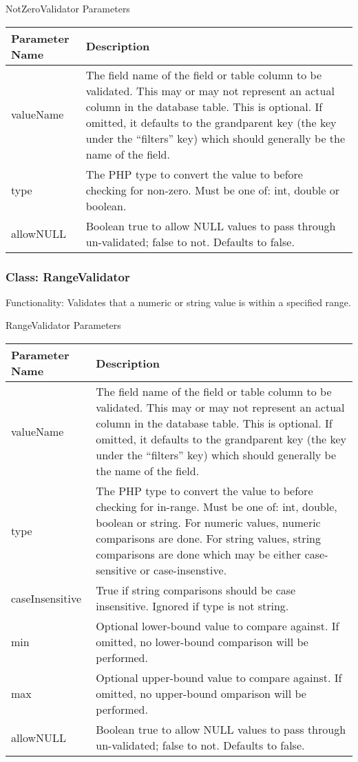 \documentclass[letterpaper,10pt,english]{sphinxmanual}
\begin{document}
NotZeroValidator Parameters

\begin{tabulary}{\linewidth}{|L|L|}
\hline
\textsf{\relax 
Parameter Name
} & \textsf{\relax 
Description
}\\
\hline
valueName
 & 
The field name of the field or table column to be validated.  This may or may not
represent an actual column in the database table.  This is optional.  If omitted, it
defaults to the grandparent key (the key under the ``filters'' key) which should
generally be the name of the field.
\\
\hline
type
 & 
The PHP type to convert the value to before checking for non-zero.  Must be one of:
int, double or boolean.
\\
\hline
allowNULL
 & 
Boolean true to allow NULL values to pass through un-validated; false to not.
Defaults to false.
\\
\hline\end{tabulary}



\subsubsection{Class: RangeValidator}
\label{jaxFrameworkGuide:class-rangevalidator}
Functionality: Validates that a numeric or string value is within a specified range.

RangeValidator Parameters

\begin{tabulary}{\linewidth}{|L|L|}
\hline
\textsf{\relax 
Parameter Name
} & \textsf{\relax 
Description
}\\
\hline
valueName
 & 
The field name of the field or table column to be validated.  This may or may not
represent an actual column in the database table.  This is optional.  If omitted, it
defaults to the grandparent key (the key under the ``filters'' key) which should
generally be the name of the field.
\\
\hline
type
 & 
The PHP type to convert the value to before checking for in-range.  Must be one of:
int, double, boolean or string.  For numeric values, numeric comparisons are done.
For string values, string comparisons are done which may be either case-sensitive or
case-insenstive.
\\
\hline
caseInsensitive
 & 
True if string comparisons should be case insensitive.  Ignored if type is not
string.
\\
\hline
min
 & 
Optional lower-bound value to compare against.  If omitted, no lower-bound
comparison will be performed.
\\
\hline
max
 & 
Optional upper-bound value to compare against.  If omitted, no upper-bound
omparison will be performed.
\\
\hline
allowNULL
 & 
Boolean true to allow NULL values to pass through un-validated; false to not.
Defaults to false.
\\
\hline\end{tabulary}
\end{document}
